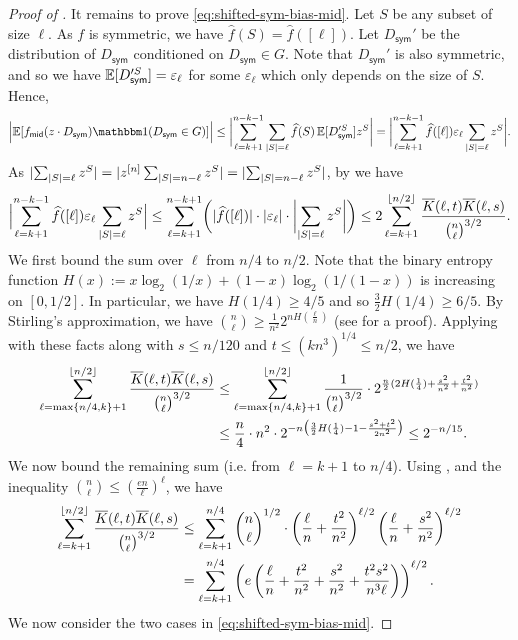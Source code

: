 \documentclass[10pt,a4paper]{article}
\theoremstyle{definition}
\newcommand{\E}{\mathop{\mathbb{E}\/}}
\newcommand{\bbone}{\mathbbm 1}
\newcommand{\Id}{\bbone}
\newcommand{\eps}{\epsilon}
\newcommand{\wh}[1]{\widehat{#1}}
\newcommand{\ol}[1]{\overline{#1}}
\newcommand{\hf}{\wh{f}}
\DeclarePairedDelimiter\abs{\lvert}{\rvert}
\DeclarePairedDelimiter\floor{\lfloor}{\rfloor}
\def\sym{\mathsf{sym}}
\def\middle{\mathsf{mid}}
\def\sK{\ol{K}}
\def\epsilon{\varepsilon}
\begin{document}
\begin{proof}[Proof of ]
  It remains to prove \cref{eq:shifted-sym-bias-mid}.
  Let $S$ be any subset of size $\ell$.
  As $f$ is symmetric, we have $\hf(S) = \hf([\ell])$.
  Let $D_\sym'$ be the distribution of $D_\sym$ conditioned on $D_\sym \in G$.
  Note that $D_\sym'$ is also symmetric, and so we have $\E[D_\sym'^S] = \eps_\ell$ for some $\eps_\ell$ which only depends on the size of $S$.
  Hence,
  \begin{align*}
  \abs[\Big]{\E[f_{\middle}(z \cdot D_{\sym}) \Id(D_\sym \in G)]}
  \le  \abs[\bigg]{ \sum_{\ell=k+1}^{n-k-1} \sum_{\abs{S}=\ell} \hf(S) \E[D_\sym'^S] z^S }
  =  \abs[\bigg]{\sum_{\ell=k+1}^{n-k-1} \hf([\ell]) \eps_\ell \sum_{\abs{S}=\ell} z^S } .
  \end{align*}
  As $\abs{\sum_{\abs{S}=\ell} z^S} = \abs{ z^{[n]} \sum_{\abs{S}=n-\ell} z^S} = \abs{\sum_{\abs{S}=n-\ell} z^S}$, by  we have
  \[
    \abs[\Big]{ \sum_{\ell=k+1}^{n-k-1} \hf([\ell]) \eps_\ell \sum_{\abs{S}=\ell} z^S }
    \le \sum_{\ell=k+1}^{n-k+1} \biggl( \abs{\hf([\ell])} \cdot \abs{\eps_\ell} \cdot \abs[\bigg]{\sum_{\abs{S}=\ell} z^S} \biggr) \\
    \le 2 \sum_{\ell=k+1}^{\floor{n/2}} \frac{\sK(\ell,t) \sK(\ell, s)    }{\binom{n}{\ell}^{3/2}}  .
  \]
  We first bound the sum over $\ell$ from $n/4$ to $n/2$.
  Note that the binary entropy function $H(x) := x \log_2(1/x) + (1-x) \log_2(1/(1-x))$ is increasing on $[0,1/2]$.
  In particular, we have $H(1/4) \ge 4/5$ and so $\frac{3}{2}H(1/4) \ge 6/5$.
  By Stirling's approximation, we have $\binom{n}{\ell} \ge \frac{1}{n^2} 2^{n H(\frac{\ell}{n})}$ (see \cite{CT06} for a proof).
  Applying  with these facts along with $s \le n/120$ and $t \le (kn^3)^{1/4} \le n/2$, we have
  \begin{align} \label{eq:shifted-sym-bias-Harm}
    \sum_{\ell=\max\{n/4,k\}+1}^{\floor{n/2}} \frac{\sK(\ell,t) \sK(\ell, s)    }{\binom{n}{\ell}^{3/2}}
    &\le \sum_{\ell=\max\{n/4,k\}+1}^{\floor{n/2}} \frac{1}{\binom{n}{\ell}^{3/2}} \cdot 2^{\frac{n}{2}(2H(\frac{1}{4})+\frac{s^2}{n^2}+\frac{t^2}{n^2})} \\
    &\le \frac{n}{4} \cdot n^2 \cdot 2^{-n \bigl( \frac{3}{2} H(\frac{1}{4}) - 1 - \frac{s^2+t^2}{2n^2} \bigr) }
    \le 2^{-n/15} .
  \end{align} 
  We now bound the remaining sum (i.e. from $\ell=k+1$ to $n/4$).
  Using , and the inequality $\binom{n}{\ell} \le (\frac{en}{\ell})^\ell$, we have
  \begin{align} 
    \sum_{\ell=k+1}^{\floor{n/2}} \frac{\sK(\ell,t) \sK(\ell, s)    }{\binom{n}{\ell}^{3/2}}
    &\le \sum_{\ell=k+1}^{n/4} \binom{n}{\ell}^{1/2} \cdot \left( \frac{\ell}{n} + \frac{t^2}{n^2} \right)^{\ell/2} \left( \frac{\ell}{n} + \frac{s^2}{n^2} \right)^{\ell/2} \nonumber \\
    &= \sum_{\ell=k+1}^{n/4} \left( e \left( \frac{\ell}{n} + \frac{t^2}{n^2} + \frac{s^2}{n^2} + \frac{t^2s^2}{n^3\ell} \right) \right)^{\ell/2} .\label{eq:shifted-sym-bias-cases}
  \end{align}
  We now consider the two cases in \cref{eq:shifted-sym-bias-mid}.

\end{proof}
\end{document}
